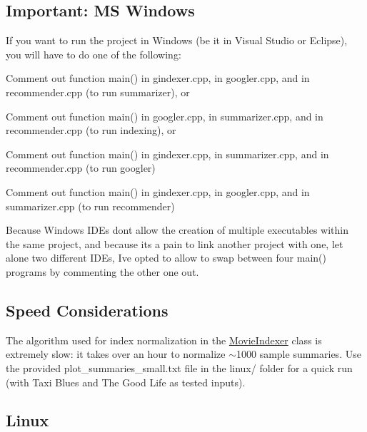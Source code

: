 \subsection*{Important\+: MS Windows}

If you want to run the project in Windows (be it in Visual Studio or Eclipse), you will have to do one of the following\+:


\begin{DoxyItemize}
\item Comment out function {\ttfamily main()} in {\ttfamily gindexer.\+cpp}, in {\ttfamily googler.\+cpp}, and in {\ttfamily recommender.\+cpp} (to run {\ttfamily summarizer}), or
\item Comment out function {\ttfamily main()} in {\ttfamily googler.\+cpp}, in {\ttfamily summarizer.\+cpp}, and in {\ttfamily recommender.\+cpp} (to run {\ttfamily indexing}), or
\item Comment out function {\ttfamily main()} in {\ttfamily gindexer.\+cpp}, in {\ttfamily summarizer.\+cpp}, and in {\ttfamily recommender.\+cpp} (to run {\ttfamily googler})
\item Comment out function {\ttfamily main()} in {\ttfamily gindexer.\+cpp}, in {\ttfamily googler.\+cpp}, and in {\ttfamily summarizer.\+cpp} (to run {\ttfamily recommender})
\end{DoxyItemize}

Because Windows I\+D\+Es don\textquotesingle{}t allow the creation of multiple executables within the same project, and because it\textquotesingle{}s a pain to link another project with one, let alone two different I\+D\+Es, I\textquotesingle{}ve opted to allow to swap between four {\ttfamily main()} programs by commenting the other one out.

\subsection*{Speed Considerations}

The algorithm used for index normalization in the {\ttfamily \hyperlink{class_movie_indexer}{Movie\+Indexer}} class is extremely slow\+: it takes over an hour to normalize $\sim$1000 sample summaries. Use the provided {\ttfamily plot\+\_\+summaries\+\_\+small.\+txt} file in the {\ttfamily linux/} folder for a quick run (with {\ttfamily Taxi Blues} and {\ttfamily The Good Life} as tested inputs).

\subsection*{Linux}

